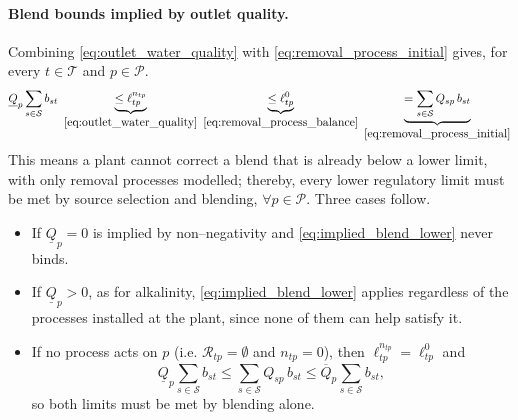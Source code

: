 \paragraph{Blend bounds implied by outlet quality.}
Combining \eqref{eq:outlet_water_quality} with \eqref{eq:removal_process_initial} gives, for every $t \in \mathcal{T}$ and $p \in \mathcal{P}$.
\begin{equation}\label{eq:implied_blend_lower}
    \underline{Q}_p \sum_{s \in \mathcal{S}} b_{st}
    ~\underbrace{\le \ell^{n_{tp}}_{tp}}_{\eqref{eq:outlet_water_quality}}
    ~\underbrace{\le \ell^{0}_{tp}}_{\eqref{eq:removal_process_balance}}
    ~\underbrace{= \sum_{s \in \mathcal{S}} Q_{sp}\, b_{st}}_{\eqref{eq:removal_process_initial}}
\end{equation}
This means a plant cannot correct a blend that is already below a lower limit, with only removal processes modelled; thereby, every lower regulatory limit must be met by source selection and blending, $\forall p \in \mathcal P$.
Three cases follow.
\begin{itemize}
    \item If $\underline{Q}_p = 0$ is implied by non–negativity and \eqref{eq:implied_blend_lower} never binds.
    \item If $\underline{Q}_p > 0$, as for alkalinity, \eqref{eq:implied_blend_lower} applies regardless of the processes installed at the plant, since none of them can help satisfy it.
    \item If no process acts on $p$ (i.e. $\mathcal R_{tp} = \emptyset$ and $n_{tp} = 0$), then $\ell^{n_{tp}}_{tp} = \ell^{0}_{tp}$ and
          \begin{equation*}
              \underline{Q}_p \sum_{s \in \mathcal{S}} b_{st}
              \le \sum_{s \in \mathcal{S}} Q_{sp}\, b_{st}
              \le \overline{Q}_p \sum_{s \in \mathcal{S}} b_{st},
          \end{equation*}
          so both limits must be met by blending alone.
\end{itemize}